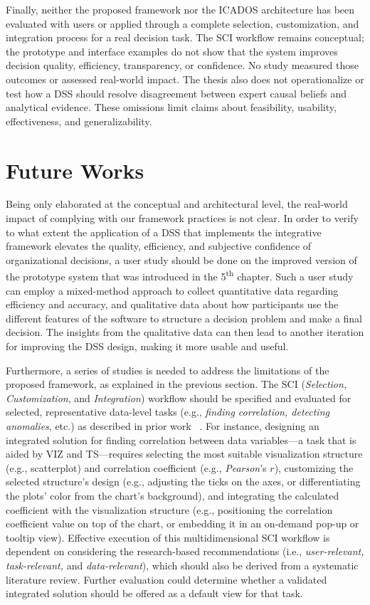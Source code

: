 \documentclass{sfuthesis}
\begin{document}
Finally, neither the proposed framework nor the ICADOS architecture has been evaluated with users or applied through a complete selection, customization, and integration process for a real decision task. The SCI workflow remains conceptual; the prototype and interface examples do not show that the system improves decision quality, efficiency, transparency, or confidence. No study measured those outcomes or assessed real-world impact. The thesis also does not operationalize or test how a DSS should resolve disagreement between expert causal beliefs and analytical evidence. These omissions limit claims about feasibility, usability, effectiveness, and generalizability.\par
\section{Future Works}
Being only elaborated at the conceptual and architectural level, the real-world impact of complying with our framework practices is not clear. In order to verify to what extent the application of a DSS that implements the integrative framework elevates the quality, efficiency, and subjective confidence of organizational decisions, a user study should be done on the improved version of the prototype system that was introduced in the 5\textsuperscript{th} chapter. Such a user study can employ a mixed-method approach to collect quantitative data regarding efficiency and accuracy, and qualitative data about how participants use the different features of the software to structure a decision problem and make a final decision. The insights from the qualitative data can then lead to another iteration for improving the DSS design, making it more usable and useful.\par
Furthermore, a series of studies is needed to address the limitations of the proposed framework, as explained in the previous section. The SCI (\textit{Selection, Customization}, and \textit{Integration}) workflow should be specified and evaluated for selected, representative data-level tasks (e.g., \textit{finding correlation, detecting anomalies}, etc.) as described in prior work ~\cite{amar_low-level_2005,brehmer2013multi}. For instance, designing an integrated solution for finding correlation between data variables—a task that is aided by VIZ and TS—requires selecting the most suitable visualization structure (e.g., scatterplot) and correlation coefficient (e.g., \textit{Pearson}’s $r$), customizing the selected structure’s design (e.g., adjusting the ticks on the axes, or differentiating the plots’ color from the chart’s background), and integrating the calculated coefficient with the visualization structure (e.g., positioning the correlation coefficient value on top of the chart, or embedding it in an on-demand pop-up or tooltip view). Effective execution of this multidimensional SCI workflow is dependent on considering the research-based recommendations (i.e., \textit{user-relevant, task-relevant,} and \textit{data-relevant}), which should also be derived from a systematic literature review. Further evaluation could determine whether a validated integrated solution should be offered as a default view for that task.\par
\end{document}
